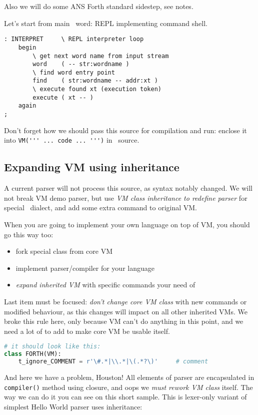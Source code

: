 \bigskip
Also we will do some ANS Forth standard sidestep, see notes.

\noindent
Let's start from main \F\ word: REPL implementing
command shell.
\begin{lstlisting}[language=Forth]
: INTERPRET		\ REPL interpreter loop
	begin
		\ get next word name from input stream
		word	( -- str:wordname ) 
		\ find word entry point
		find	( str:wordname -- addr:xt )
		\ execute found xt (execution token) 
		execute	( xt -- ) 
	again
;
\end{lstlisting}
Don't forget how we should pass this source for compilation and run:
enclose it into \verb|VM(''' ... code ... ''')| in \py\ source.

\subsection{Expanding VM using inheritance}

A current parser will not process this source, as syntax notably changed.
We will not break VM demo parser, but use \emph{VM class inheritance to redefine
parser} for special \F\ dialect, and add some extra command to original VM.

When you are going to implement your own language on top of VM, you should 
go this way too:
\begin{itemize}
\item fork special class from core VM
\item implement parser/compiler for your language
\item \emph{expand inherited VM} with specific commands your need of
\end{itemize}
Last item must be focused: \emph{don't change core VM class} with new commands
or modified behaviour, as this changes will impact on all other inherited VMs.
We broke this rule here, only because VM can't do anything in this point, and we
need a lot of to add to make core VM be usable itself.

\begin{lstlisting}[language=Python]
# it should look like this:
class FORTH(VM):
	t_ignore_COMMENT = r'\#.*|\\.*|\(.*?\)'		# comment
\end{lstlisting}

And here we have a problem, Houston! All elements of parser are encapsulated
in \verb|compiler()| method using closure, and oops we \emph{must rework VM
class} itself. The way we can do it you can see on this short sample. This is
lexer-only variant of simplest Hello World parser uses inheritance:


